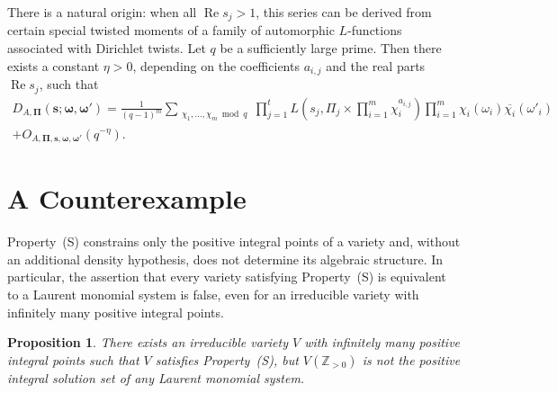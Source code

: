 \documentclass[12pt,reqno]{amsart}
\numberwithin{equation}{section}
\theoremstyle{plain}
\newtheorem{proposition}[theorem]{Proposition}
\theoremstyle{definition}
\theoremstyle{remark}
\renewcommand{\Re}{\operatorname{Re}}
\begin{document}
There is a natural origin: when all $\Re s_j > 1$, this series can be derived
from certain special twisted moments of a family of automorphic $L$-functions
associated with Dirichlet twists. Let $q$ be a sufficiently large prime.
Then there exists a constant $\eta > 0$, depending on the coefficients $a_{i,j}$
and the real parts $\Re s_j$, such that
\begin{multline*}
D_{A, \boldsymbol{\Pi}}(\boldsymbol{s}; \boldsymbol{\omega}, \boldsymbol{\omega'}) =
\frac{1}{(q-1)^{m}} \sum_{\substack{\chi_1, \dots, \chi_m \bmod{q}}}
\prod_{j=1}^{t} L\!\left(s_j, \Pi_j \times \prod_{i=1}^{m} \chi_i^{a_{i,j}} \right)
\prod_{i=1}^{m} \chi_i(\omega_i)\overline{\chi_i}(\omega'_i)
\\
+ O_{A,\boldsymbol{\Pi},\boldsymbol{s},\boldsymbol{\omega},\boldsymbol{\omega'}}
\!\left(q^{-\eta}\right).
\end{multline*}


\section{A Counterexample}

Property~(S) constrains only the positive integral points of a variety and, without an additional density hypothesis, does not determine its algebraic structure. In particular, the assertion that every variety satisfying Property~(S) is equivalent to a Laurent monomial system is false, even for an irreducible variety with infinitely many positive integral points.

\begin{proposition}\label{prop:conter}
There exists an irreducible variety \(V\) with infinitely many positive integral points such that \(V\) satisfies Property~(S), but \(V(\mathbb{Z}_{>0})\) is not the positive integral solution set of any Laurent monomial system.
\end{proposition}
\end{document}
